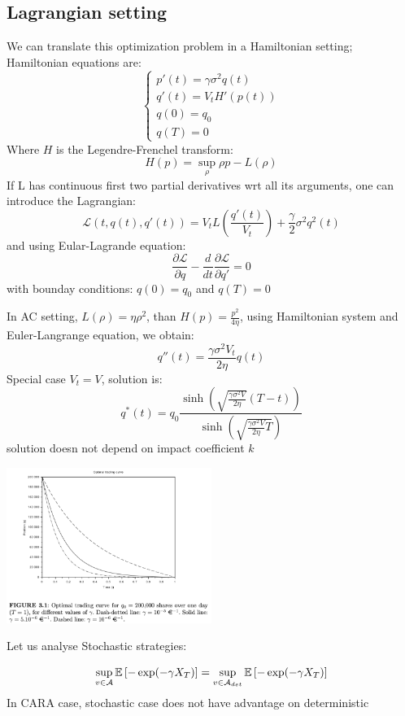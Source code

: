 \subsection{Lagrangian setting}
We can translate this optimization problem in a Hamiltonian setting; Hamiltonian equations are:
\[
\begin{cases}
	 p'(t) = \gamma \sigma^2 q(t)\\
	 q'(t) = V_t H'(p(t))\\
	 q(0) = q_0\\
	 q(T) = 0
\end{cases}
\]
Where $H$ is the Legendre-Frenchel transform:
\[
H(p) = \sup_{\rho} \rho p - L(\rho)
\]
If L has continuous first two partial derivatives wrt all its arguments, one can introduce the Lagrangian:
\[
\mathcal{L}(t,q(t),q'(t))=V_t L\left(\frac{q'(t)}{V_t}\right) + \frac{\gamma}{2} \sigma^2 q^2(t)
\]
and using Eular-Lagrande equation:
\[
\frac{\partial \mathcal{L}}{\partial q} - \frac{d}{dt} \frac{\partial \mathcal{L}}{\partial q'} = 0
\]
with bounday conditions: $q(0) =q_0$ and $q(T) = 0$
\newpage
\begin{mytheorem}
In AC setting, $L(\rho) = \eta \rho^2$, than $H(p) = \frac{p^2}{4 \eta}$, using Hamiltonian system and Euler-Langrange equation, we obtain:
\[
q''(t) = \frac{\gamma \sigma^2 V_t}{2 \eta}q(t)
\]
Special case $V_t = V$, solution is:
\[
q^*(t) = q_0 \frac{\sinh \left(\sqrt{\frac{\gamma \sigma^2 V}{2 \eta}}(T-t)\right)}{\sinh \left(\sqrt{\frac{\gamma \sigma^2 V}{2 \eta}T}\right)}
\]
solution doesn not depend on impact coefficient $k$
\end{mytheorem}
\begin{center}
	\includegraphics[width=0.5\textwidth]{picture/(8)AC_optimal_solution.png}
\end{center}
Let us analyse Stochastic strategies:
\begin{mytheorem}
	\[
	\sup_{v \in \mathcal{A}} \mathbb{E}\left[-\exp({-\gamma X_T})\right] = \sup_{v \in \mathcal{A}_{det}} \mathbb{E}\left[- \exp(-\gamma X_T)\right]
	\]
In CARA case, stochastic case does not have advantage on deterministic
\end{mytheorem}
